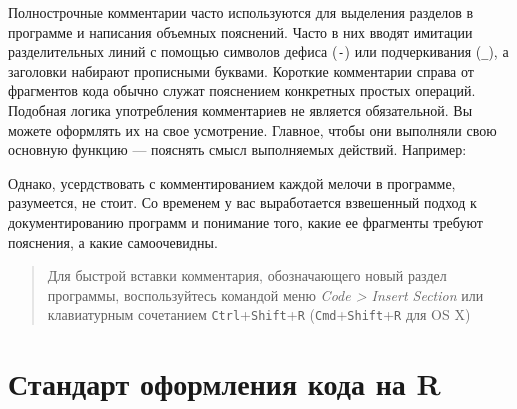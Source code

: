 \documentclass[]{book}
\newenvironment{Shaded}{\begin{snugshade}}{\end{snugshade}}
\newcommand{\DecValTok}[1]{\textcolor[rgb]{0.00,0.00,0.81}{#1}}
\newcommand{\StringTok}[1]{\textcolor[rgb]{0.31,0.60,0.02}{#1}}
\newcommand{\CommentTok}[1]{\textcolor[rgb]{0.56,0.35,0.01}{\textit{#1}}}
\newcommand{\OperatorTok}[1]{\textcolor[rgb]{0.81,0.36,0.00}{\textbf{#1}}}
\newcommand{\NormalTok}[1]{#1}
\begin{document}
Полнострочные комментарии часто используются для выделения разделов в
программе и написания объемных пояснений. Часто в них вводят имитации
разделительных линий с помощью символов дефиса (\texttt{-}) или
подчеркивания (\texttt{\_}), а заголовки набирают прописными буквами.
Короткие комментарии справа от фрагментов кода обычно служат пояснением
конкретных простых операций. Подобная логика употребления комментариев
не является обязательной. Вы можете оформлять их на свое усмотрение.
Главное, чтобы они выполняли свою основную функцию --- пояснять смысл
выполняемых действий. Например:

\begin{Shaded}
\end{Shaded}

Однако, усердствовать с комментированием каждой мелочи в программе,
разумеется, не стоит. Со временем у вас выработается взвешенный подход к
документированию программ и понимание того, какие ее фрагменты требуют
пояснения, а какие самоочевидны.

\begin{quote}
Для быстрой вставки комментария, обозначающего новый раздел программы,
воспользуйтесь командой меню \emph{Code \textgreater{} Insert Section}
или клавиатурным сочетанием \texttt{Ctrl}+\texttt{Shift}+\texttt{R}
(\texttt{Cmd}+\texttt{Shift}+\texttt{R} для OS X)
\end{quote}

\section*{Стандарт оформления кода на R}\label{----r}
\end{document}
